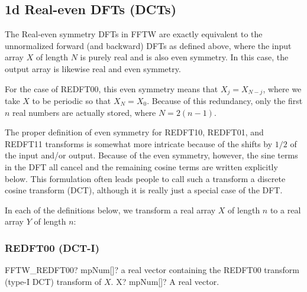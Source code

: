 \subsection{1d Real-even DFTs (DCTs)}
%
%
%
The Real-even symmetry DFTs in FFTW are exactly equivalent to the unnormalized forward (and backward) DFTs as defined above, where the input array $X$ of length $N$ is purely real and is also even symmetry. In this case, the output array is likewise real and even symmetry.


For the case of REDFT00, this even symmetry means that $X_j = X_{N-j}$, where we take $X$ to
be periodic so that $X_N = X_0$. Because of this redundancy, only the first $n$ real numbers
are actually stored, where $N = 2(n - 1)$.


The proper definition of even symmetry for REDFT10, REDFT01, and REDFT11 transforms is
somewhat more intricate because of the shifts by $1/2$ of the input and/or output. Because of the even symmetry, however, the sine terms in the DFT all cancel and the remaining cosine terms are written explicitly below. This formulation often leads people to call such a transform a discrete cosine transform (DCT), although it is really just a special case of the DFT.

In each of the definitions below, we transform a real array $X$ of length $n$ to a real array $Y$ of length $n$:


\subsubsection{REDFT00 (DCT-I)}

\begin{mpFunctionsExtract}
	\mpFunctionOne
	{FFTW\_REDFT00? mpNum[]? a real vector containing the REDFT00 transform (type-I DCT) transform of $X$.}
	{X? mpNum[]? A real vector.}
\end{mpFunctionsExtract}

